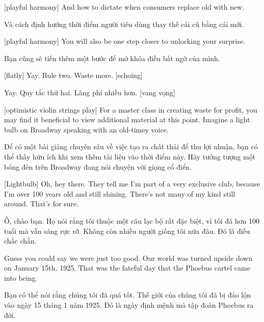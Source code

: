 \documentclass[a4paper]{article}
\begin{document}
	[playful harmony]
	And how to dictate when consumers replace old with new.
	
	\begin{vietnamese-v2}
		Và cách định hướng thời điểm người tiêu dùng thay thế cái cũ bằng cái mới.
	\end{vietnamese-v2}
	
	[playful harmony]
	You will also be one step closer to unlocking your surprise.
	
	\begin{vietnamese-v2}
		Bạn cũng sẽ tiến thêm một bước để mở khóa điều bất ngờ của mình.
	\end{vietnamese-v2}
	
	
	[flatly] Yay.
	Rule two.
	Waste more. [echoing]
	
	\begin{vietnamese-v2}
		 Yay. 
		Quy tắc thứ hai. 
		Lãng phí nhiều hơn. [vang vọng]
	\end{vietnamese-v2}
	
	[optimistic violin strings play]
	For a master class in creating waste for profit, you may find it beneficial to view additional material at this point.
	Imagine a light bulb on Broadway speaking with an old-timey voice.
	
	\begin{vietnamese-v2}
		Để có một bài giảng chuyên sâu về việc tạo ra chất thải để thu lợi nhuận, bạn có thể thấy hữu ích khi xem thêm tài liệu vào thời điểm này. 
		Hãy tưởng tượng một bóng đèn trên Broadway đang nói chuyện với giọng cổ điển.
	\end{vietnamese-v2}
	
	[Lightbulb] Oh, hey there.
	They tell me I'm part of a very exclusive club, because I'm over 100 years old and still shining.
	There's not many of my kind still around. That's for sure.
	
	\begin{vietnamese-v2}
		 Ồ, chào bạn. 
		Họ nói rằng tôi thuộc một câu lạc bộ rất đặc biệt, vì tôi đã hơn 100 tuổi mà vẫn sáng rực rỡ. 
		Không còn nhiều người giống tôi nữa đâu. Đó là điều chắc chắn.
	\end{vietnamese-v2}
	
	Guess you could say we were just too good.
	Our world was turned upside down on January 15th, 1925.
	That was the fateful day that the Phoebus cartel came into being.
	
	\begin{vietnamese-v2}
		Bạn có thể nói rằng chúng tôi đã quá tốt. 
		Thế giới của chúng tôi đã bị đảo lộn vào ngày 15 tháng 1 năm 1925. 
		Đó là ngày định mệnh mà tập đoàn Phoebus ra đời.
	\end{vietnamese-v2}
	
\end{document}
